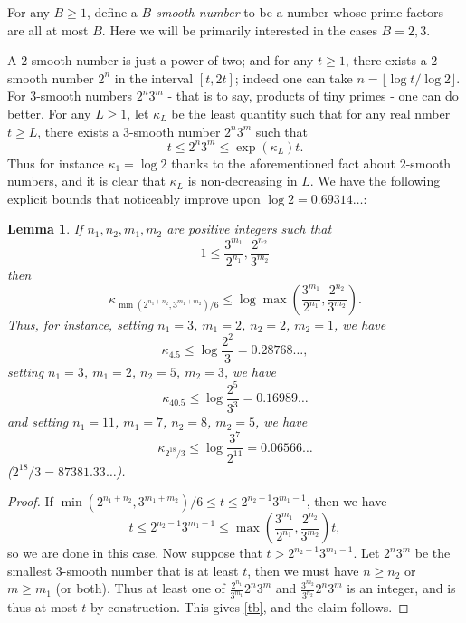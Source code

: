 \documentclass[12pt,a4paper,reqno]{amsart}
\numberwithin{equation}{section}
\theoremstyle{plain}
\newtheorem{lemma}[theorem]{Lemma}
\theoremstyle{definition}
\begin{document}
For any $B \geq 1$, define a \emph{$B$-smooth number} to be a number whose prime factors are all at most $B$.  Here we will be primarily interested in the cases $B=2,3$.

A $2$-smooth number is just a power of two; and for any $t \geq 1$, there exists a $2$-smooth number $2^n$ in the interval $[t,2t]$;
indeed one can take $n = \lfloor \log t / \log 2 \rfloor$.  For $3$-smooth numbers $2^n 3^m$ - that is to say, products of tiny primes - one can do better.  For any $L \geq 1$, let $\kappa_L$ be the least quantity such that for any real nmber $t \geq L$, there exists a $3$-smooth number $2^n 3^m$ such that
$$ t \leq 2^n 3^m \leq \exp(\kappa_L) t.$$
Thus for instance $\kappa_1 = \log 2$ thanks to the aforementioned fact about $2$-smooth numbers, and it is clear that $\kappa_L$ is non-decreasing in $L$.  We have the following explicit bounds that noticeably improve upon $\log 2 = 0.69314\dots$:

\begin{lemma}\label{lemcount-0}  If $n_1,n_2,m_1,m_2$ are positive integers such that
$$ 1 \leq \frac{3^{m_1}}{2^{n_1}}, \frac{2^{n_2}}{3^{m_2}}$$
then
$$ \kappa_{\min( 2^{n_1+n_2},3^{m_1+m_2})/6} \leq \log \max\left(\frac{3^{m_1}}{2^{n_1}}, \frac{2^{n_2}}{3^{m_2}}\right).$$
Thus, for instance, setting $n_1=3$, $m_1=2$, $n_2=2$, $m_2=1$, we have
$$ \kappa_{4.5} \leq \log \frac{2^2}{3} = 0.28768\dots,$$
setting $n_1 = 3$, $m_1 = 2$, $n_2 = 5$, $m_2 = 3$, we have
$$\kappa_{40.5} \leq \log \frac{2^5}{3^3} = 0.16989\dots$$ 
and setting $n_1 = 11$, $m_1 = 7$, $n_2 = 8$, $m_2 = 5$, we have 
$$\kappa_{2^{18}/3} \leq \log \frac{3^7}{2^{11}} = 0.06566\dots$$
($2^{18}/3 = 87381.33\dots$).
\end{lemma}

\begin{proof}  If $\min( 2^{n_1+n_2},3^{m_1+m_2})/6 \leq t \leq 2^{n_2-1} 3^{m_1-1}$, then we have
\begin{equation}\label{tb} 
  t \leq 2^{n_2-1} 3^{m_1-1} \leq \max(\frac{3^{m_1}}{2^{n_1}}, \frac{2^{n_2}}{3^{m_2}}) t,
\end{equation}
so we are done in this case.  Now suppose that $t > 2^{n_2-1} 3^{m_1-1}$.
Let $2^n 3^m$ be the smallest $3$-smooth number that is at least $t$, then we must have $n \geq n_2$ or $m \geq m_1$ (or both).  Thus at least one of $\frac{2^{n_1}}{3^{m_1}} 2^n 3^m$ and $\frac{3^{m_2}}{3^{n_2}} 2^n 3^m$ is an integer, and is thus at most $t$ by construction.  This gives \eqref{tb}, and the claim follows.
\end{proof}
\end{document}
